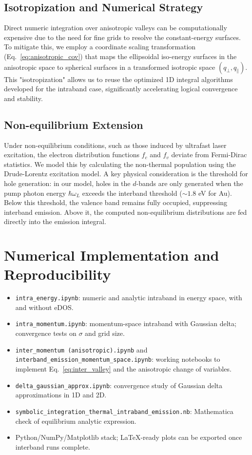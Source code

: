 \subsection{Isotropization and Numerical Strategy}
Direct numeric integration over anisotropic valleys can be computationally expensive due to the need for fine grids to resolve the constant-energy surfaces. To mitigate this, we employ a coordinate scaling transformation (Eq.~\ref{eq:anisotropic_cov}) that maps the ellipsoidal iso-energy surfaces in the anisotropic space to spherical surfaces in a transformed isotropic space $(q_{\perp}, q_{\parallel})$. This "isotropization" allows us to reuse the optimized 1D integral algorithms developed for the intraband case, significantly accelerating logical convergence and stability.

\subsection{Non-equilibrium Extension}
Under non-equilibrium conditions, such as those induced by ultrafast laser excitation, the electron distribution functions $f_c$ and $f_v$ deviate from Fermi-Dirac statistics. We model this by calculating the non-thermal population using the Drude-Lorentz excitation model. A key physical consideration is the threshold for hole generation: in our model, holes in the $d$-bands are only generated when the pump photon energy $\hbar\omega_L$ exceeds the interband threshold ($\sim 1.8$ eV for Au). Below this threshold, the valence band remains fully occupied, suppressing interband emission. Above it, the computed non-equilibrium distributions are fed directly into the emission integral.

\section{Numerical Implementation and Reproducibility}
\begin{itemize}
  \item \texttt{intra\_energy.ipynb}: numeric and analytic intraband in energy space, with and without eDOS.
  \item \texttt{intra\_momentum.ipynb}: momentum-space intraband with Gaussian delta; convergence tests on $\sigma$ and grid size.
  \item \texttt{inter\_momentum (anisotropic).ipynb} and \texttt{interband\_emission\_momentum\_space.ipynb}: working notebooks to implement Eq.~\eqref{eq:inter_valley} and the anisotropic change of variables.
  \item \texttt{delta\_gaussian\_approx.ipynb}: convergence study of Gaussian delta approximations in 1D and 2D.
  \item \texttt{symbolic\_integration\_thermal\_intraband\_emission.nb}: Mathematica check of equilibrium analytic expression.
  \item Python/NumPy/Matplotlib stack; LaTeX-ready plots can be exported once interband runs complete.
\end{itemize}

